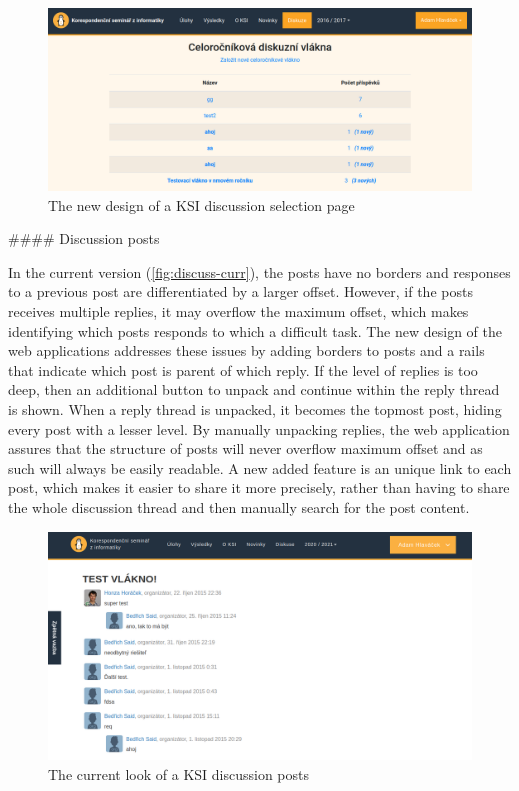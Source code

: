 \documentclass[
  digital, %
  oneside, %
  lof,     %
  nolot,     %
]{fithesis4}
\begin{document}
{\begin{figure}
\includegraphics[width=\textwidth]{assets/img/discussionroot-new}
\caption{The new design of a KSI discussion selection page}
\label{fig:discussroot-new}
\end{figure}

#### Discussion posts

In the current version (\autoref{fig:discuss-curr}), the posts have no borders and responses to a previous post are differentiated by a larger offset. However, if the posts receives multiple replies, it may overflow the maximum offset, which makes identifying which posts responds to which a difficult task. The new design of the web applications addresses these issues by adding borders to posts and a rails that indicate which post is parent of which reply. If the level of replies is too deep, then an additional button to unpack and continue within the reply thread is shown. When a reply thread is unpacked, it becomes the topmost post, hiding every post with a lesser level. By manually unpacking replies, the web application assures that the structure of posts will never overflow maximum offset and as such will always be easily readable. A new added feature is an unique link to each post, which makes it easier to share it more precisely, rather than having to share the whole discussion thread and then manually search for the post content.

\begin{figure}
\includegraphics[width=\textwidth]{assets/img/discussion-curr}
\caption{The current look of a KSI discussion posts}
\label{fig:discuss-curr}
\end{figure}

}
\end{document}
